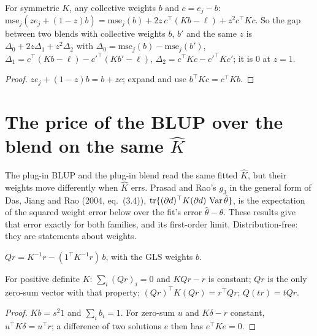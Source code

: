 \begin{lemma}\label{lem:Core_linMse_lineWeight}
  \leanok
  For symmetric $K$, any collective weights $b$ and $c = e_j - b$:
  $\mathrm{mse}_j(ze_j + (1 - z)b) = \mathrm{mse}_j(b) + 2z\,c^\top(Kb - \ell) + z^2c^\top Kc$.
  So the gap between two blends with collective weights $b$, $b'$ and the same $z$ is
  $\Delta_0 + 2z\Delta_1 + z^2\Delta_2$ with $\Delta_0 = \mathrm{mse}_j(b) - \mathrm{mse}_j(b')$,
  $\Delta_1 = c^\top(Kb - \ell) - c'^\top(Kb' - \ell)$, $\Delta_2 = c^\top Kc - c'^\top Kc'$; it is
  $0$ at $z = 1$.
\end{lemma}
\begin{proof}
  \leanok
  $ze_j + (1 - z)b = b + zc$; expand and use $b^\top Kc = c^\top Kb$.
\end{proof}

\section{The price of the BLUP over the blend on the same $\hat K$}

The plug-in BLUP and the plug-in blend read the same fitted $\hat K$, but their weights move
differently when $\hat K$ errs. Prasad and Rao's $g_3$ in the general form of Das, Jiang and Rao
(2004, eq.~(3.4)), $\operatorname{tr}\{(\partial d)^\top K(\partial d)\,\operatorname{Var}\hat\theta\}$, is the
expectation of the squared weight error below over the fit's error $\hat\theta - \theta$. These
results give that error exactly for both families, and its first-order limit. Distribution-free:
they are statements about weights.

\begin{definition}\label{def:Core_zeroSumSolve}
  \leanok
  $Qr = K^{-1}r - (1^\top K^{-1}r)\,b$, with the GLS weights $b$.
\end{definition}

\begin{lemma}\label{lem:Core_zeroSumSolve}
  \leanok
  For positive definite $K$: $\sum_i (Qr)_i = 0$ and $KQr - r$ is constant; $Qr$ is the only
  zero-sum vector with that property; $(Qr)^\top K(Qr) = r^\top Qr$; $Q(tr) = tQr$.
\end{lemma}
\begin{proof}
  \leanok
  $Kb = s^2 1$ and $\sum_i b_i = 1$. For zero-sum $u$ and $K\delta - r$ constant,
  $u^\top K\delta = u^\top r$; a difference of two solutions $e$ then has $e^\top Ke = 0$.
\end{proof}

